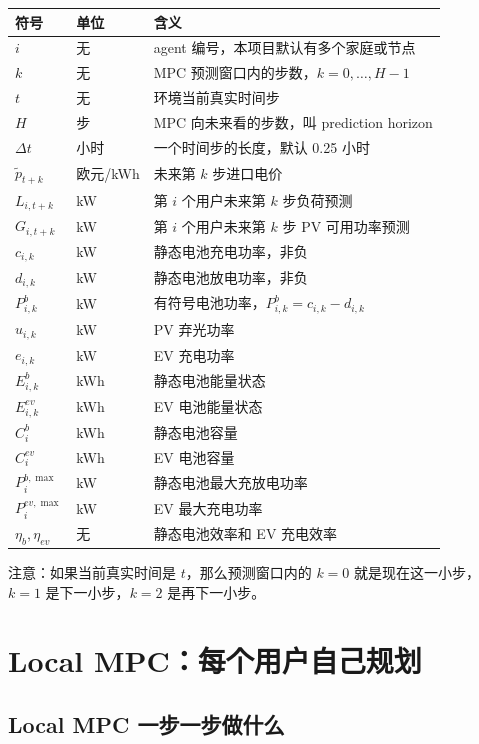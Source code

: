 \documentclass[UTF8,zihao=-4]{ctexart}
\begin{document}
\begin{longtable}{>{\centering\arraybackslash}p{3.0cm}p{3.8cm}p{7.6cm}}
\toprule
符号 & 单位 & 含义 \\
\midrule
\endhead
$i$ & 无 & agent 编号，本项目默认有多个家庭或节点 \\
$k$ & 无 & MPC 预测窗口内的步数，$k=0,\dots,H-1$ \\
$t$ & 无 & 环境当前真实时间步 \\
$H$ & 步 & MPC 向未来看的步数，叫 prediction horizon \\
$\Delta t$ & 小时 & 一个时间步的长度，默认 0.25 小时 \\
$\tilde p_{t+k}$ & 欧元/kWh & 未来第 $k$ 步进口电价 \\
$L_{i,t+k}$ & kW & 第 $i$ 个用户未来第 $k$ 步负荷预测 \\
$G_{i,t+k}$ & kW & 第 $i$ 个用户未来第 $k$ 步 PV 可用功率预测 \\
$c_{i,k}$ & kW & 静态电池充电功率，非负 \\
$d_{i,k}$ & kW & 静态电池放电功率，非负 \\
$P^b_{i,k}$ & kW & 有符号电池功率，$P^b_{i,k}=c_{i,k}-d_{i,k}$ \\
$u_{i,k}$ & kW & PV 弃光功率 \\
$e_{i,k}$ & kW & EV 充电功率 \\
$E^b_{i,k}$ & kWh & 静态电池能量状态 \\
$E^{ev}_{i,k}$ & kWh & EV 电池能量状态 \\
$C^b_i$ & kWh & 静态电池容量 \\
$C^{ev}_i$ & kWh & EV 电池容量 \\
$P^{b,\max}_i$ & kW & 静态电池最大充放电功率 \\
$P^{ev,\max}_i$ & kW & EV 最大充电功率 \\
$\eta_b,\eta_{ev}$ & 无 & 静态电池效率和 EV 充电效率 \\
\bottomrule
\end{longtable}

注意：如果当前真实时间是 $t$，那么预测窗口内的 $k=0$ 就是现在这一小步，$k=1$ 是下一小步，$k=2$ 是再下一小步。

\section{Local MPC：每个用户自己规划}

\subsection{Local MPC 一步一步做什么}
\end{document}
